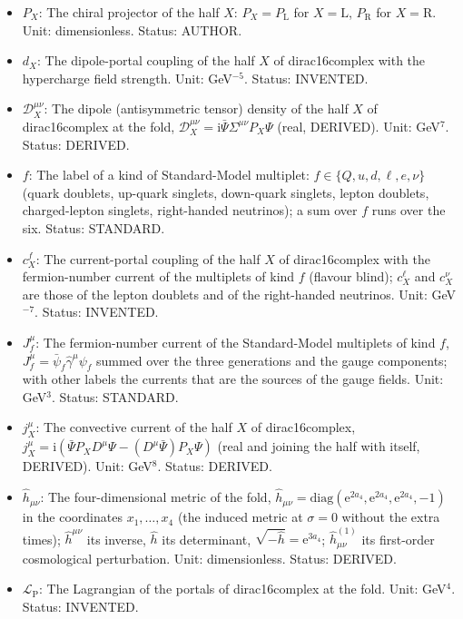 \documentclass[
  10pt,
]{article}
\begin{document}
\begin{itemize}
  \(\bar\Psi = \Psi^\dagger\sigma_{16}\) is its Dirac adjoint; in a term
  of the fold, \(\Psi\) is its value at \(\sigma = 0\). Unit:
  GeV\(^{7/2}\). Status: AUTHOR.
\item
  \(P_X\): The chiral projector of the half \(X\):
  \(P_X = P_{\mathrm{L}}\) for \(X = \mathrm{L}\), \(P_{\mathrm{R}}\)
  for \(X = \mathrm{R}\). Unit: dimensionless. Status: AUTHOR.
\item
  \(d_X\): The dipole-portal coupling of the half \(X\) of
  dirac16complex with the hypercharge field strength. Unit:
  GeV\(^{-5}\). Status: INVENTED.
\item
  \(\mathcal{D}_X^{\mu\nu}\): The dipole (antisymmetric tensor) density
  of the half \(X\) of dirac16complex at the fold,
  \(\mathcal{D}_X^{\mu\nu} = \mathrm{i}\bar\Psi\Sigma^{\mu\nu}P_X\Psi\)
  (real, DERIVED). Unit: GeV\(^7\). Status: DERIVED.
\item
  \(f\): The label of a kind of Standard-Model multiplet:
  \(f \in \{Q, u, d, \ell, e, \nu\}\) (quark doublets, up-quark
  singlets, down-quark singlets, lepton doublets, charged-lepton
  singlets, right-handed neutrinos); a sum over \(f\) runs over the six.
  Status: STANDARD.
\item
  \(c^{f}_X\): The current-portal coupling of the half \(X\) of
  dirac16complex with the fermion-number current of the multiplets of
  kind \(f\) (flavour blind); \(c^{\ell}_X\) and \(c^{\nu}_X\) are those
  of the lepton doublets and of the right-handed neutrinos. Unit:
  GeV\(^{-7}\). Status: INVENTED.
\item
  \(J_f^\mu\): The fermion-number current of the Standard-Model
  multiplets of kind \(f\), \(J_f^\mu = \bar\psi_f\hat\gamma^\mu\psi_f\)
  summed over the three generations and the gauge components; with other
  labels the currents that are the sources of the gauge fields. Unit:
  GeV\(^3\). Status: STANDARD.
\item
  \(j_X^\mu\): The convective current of the half \(X\) of
  dirac16complex,
  \(j_X^\mu = \mathrm{i}(\bar\Psi P_XD^\mu\Psi - (D^\mu\bar\Psi)P_X\Psi)\)
  (real and joining the half with itself, DERIVED). Unit: GeV\(^8\).
  Status: DERIVED.
\item
  \(\hat h_{\mu\nu}\): The four-dimensional metric of the fold,
  \(\hat h_{\mu\nu} = \mathrm{diag}(\mathrm{e}^{2a_4}, \mathrm{e}^{2a_4}, \mathrm{e}^{2a_4}, -1)\)
  in the coordinates \(x_1, \dots, x_4\) (the induced metric at
  \(\sigma = 0\) without the extra times); \(\hat h^{\mu\nu}\) its
  inverse, \(\hat h\) its determinant,
  \(\sqrt{-\hat h} = \mathrm{e}^{3a_4}\); \(\hat h^{(1)}_{\mu\nu}\) its
  first-order cosmological perturbation. Unit: dimensionless. Status:
  DERIVED.
\item
  \(\mathcal{L}_{\mathrm{P}}\): The Lagrangian of the portals of
  dirac16complex at the fold. Unit: GeV\(^4\). Status: INVENTED.
\end{itemize}
\end{document}
